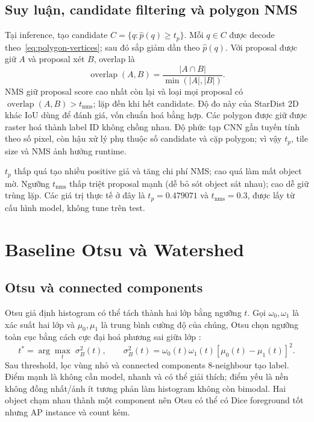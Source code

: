 \documentclass[12pt,a4paper]{report}
\begin{document}
\subsection{Suy luận, candidate filtering và polygon NMS}
Tại inference, tạo candidate $C=\{q:\hat p(q)\ge t_p\}$. Mỗi $q\in C$ được
decode theo~\eqref{eq:polygon-vertices}; sau đó sắp giảm dần theo $\hat p(q)$.
Với proposal được giữ $A$ và proposal xét $B$, overlap là
\begin{equation}
 \operatorname{overlap}(A,B)=\frac{|A\cap B|}{\min(|A|,|B|)}.
 \label{eq:polygon-iou}
\end{equation}
NMS giữ proposal score cao nhất còn lại và loại mọi proposal có
$\operatorname{overlap}(A,B)>t_{\mathrm{nms}}$; lặp đến khi hết candidate. Độ đo này của StarDist 2D khác IoU dùng để đánh giá, vốn chuẩn hoá bằng hợp. Các
polygon được giữ được raster hoá thành label ID không chồng nhau. Độ phức tạp
CNN gần tuyến tính theo số pixel, còn hậu xử lý phụ thuộc số candidate và cặp
polygon; vì vậy $t_p$, tile size và NMS ảnh hưởng runtime.

$t_p$ thấp quá
tạo nhiều positive giả và tăng chi phí NMS; cao quá làm mất object mờ. Ngưỡng
$t_{\mathrm{nms}}$ thấp triệt proposal mạnh (dễ bỏ sót object sát nhau); cao
dễ giữ trùng lặp. Các giá trị thực tế ở đây là $t_p=0.479071$ và
$t_{\mathrm{nms}}=0.3$, được lấy từ cấu hình model, không tune trên test.

\section{Baseline Otsu và Watershed}
\subsection{Otsu và connected components}
Otsu giả định histogram có thể tách thành hai lớp bằng ngưỡng $t$. Gọi
$\omega_0,\omega_1$ là xác suất hai lớp và $\mu_0,\mu_1$ là trung bình cường
độ của chúng, Otsu chọn ngưỡng toàn cục bằng cách cực đại hoá phương sai giữa
lớp \citep{otsu1979threshold}:
\begin{equation}
 t^*=\arg\max_t\;\sigma_B^2(t),\qquad
 \sigma_B^2(t)=\omega_0(t)\omega_1(t)[\mu_0(t)-\mu_1(t)]^2.
 \label{eq:otsu}
\end{equation}
Sau threshold, lọc vùng nhỏ và connected components 8-neighbour tạo label.
Điểm mạnh là không cần model, nhanh và có thể giải thích; điểm yếu là nền không
đồng nhất/ảnh ít tương phản làm histogram không còn bimodal. Hai object chạm nhau thành một component nên Otsu có thể có Dice foreground tốt
nhưng AP instance và count kém.
\end{document}

